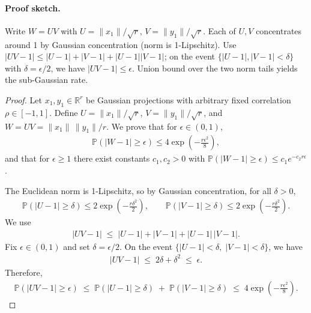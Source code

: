 \paragraph{Proof sketch.} Write \(W=UV\) with \(U=\|x_1\|/\sqrt{r}\), \(V=\|y_1\|/\sqrt{r}\). Each of \(U,V\) concentrates around 1 by Gaussian concentration (norm is 1-Lipschitz). Use \(|UV-1|\le |U-1|+|V-1|+|U-1||V-1|\); on the event \(\{|U-1|,|V-1|<\delta\}\) with \(\delta=\epsilon/2\), we have \(|UV-1|\le\epsilon\). Union bound over the two norm tails yields the sub-Gaussian rate.
\begin{proof}
Let \( x_1,y_1\in\mathbb{R}^r \) be Gaussian projections with arbitrary fixed correlation \( \rho\in[-1,1] \). Define \( U=\|x_1\|/\sqrt{r} \), \( V=\|y_1\|/\sqrt{r} \), and \( W=UV=\|x_1\|\,\|y_1\|/r \). We prove that for \( \epsilon\in(0,1) \),
\begin{align}
\mathbb{P}\!\left(\left|W-1\right|\ge \epsilon\right)\le 4\exp\!\left(-\frac{r\epsilon^2}{8}\right),
\end{align}
and that for \( \epsilon\ge 1 \) there exist constants \( c_1,c_2>0 \) with \( \mathbb{P}(|W-1|\ge \epsilon)\le c_1 e^{-c_2 r\epsilon} \).

The Euclidean norm is 1-Lipschitz, so by Gaussian concentration, for all \( \delta>0 \),
\begin{align}
\mathbb{P}\!\left(\left|U-1\right|\ge \delta\right)\le 2\exp\!\left(-\frac{r\delta^2}{2}\right),\qquad
\mathbb{P}\!\left(\left|V-1\right|\ge \delta\right)\le 2\exp\!\left(-\frac{r\delta^2}{2}\right).
\end{align}
We use
\begin{align}
|UV-1|\;\le\;|U-1|+|V-1|+|U-1|\,|V-1|.
\end{align}
Fix \( \epsilon\in(0,1) \) and set \( \delta=\epsilon/2 \). On the event \( \{|U-1|<\delta,\;|V-1|<\delta\} \), we have
\begin{align}
|UV-1|\;\le\;2\delta+\delta^2\;\le\; \epsilon.
\end{align}
Therefore,
\begin{align}
\mathbb{P}\!\left(|UV-1|\ge \epsilon\right)\;\le\; \mathbb{P}\!\left(|U-1|\ge \delta\right)\;+\;\mathbb{P}\!\left(|V-1|\ge \delta\right) \;\le\;4\exp\!\left(-\frac{r\epsilon^2}{8}\right).
\end{align}
\end{proof}

